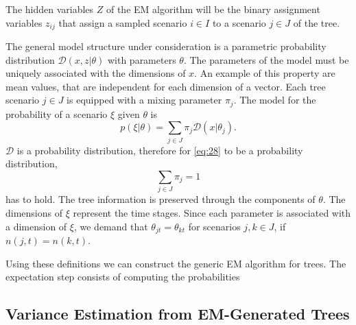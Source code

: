 The hidden variables $Z$ of the EM algorithm will be the binary assignment variables $z_{ij}$ that
assign a sampled scenario $i\in I$ to a scenario $j\in J$ of the tree.

The general model structure under consideration is a parametric probability distribution $\mathcal{D}(x,z|\theta)$ with parameters $\theta$.
The parameters of the model must be uniquely associated with the dimensions of $x$.
An example of this property are mean values, that are independent for each dimension of a vector.
Each tree scenario $j\in J$ is equipped with a mixing parameter $\pi_j$.
The model for the probability of a scenario $\xi$ given $\theta$ is
\begin{equation}
  \label{eq:28}
  p(\xi|\theta) = \sum_{j\in J}\pi_j\mathcal{D}(x|\theta_j).
\end{equation}
$\mathcal{D}$ is a probability distribution, therefore for \eqref{eq:28} to be a probability distribution,
\begin{equation}
  \label{eq:30}
  \sum_{j\in J}\pi_j = 1
\end{equation}
has to hold.
The tree information is preserved through the components of $\theta$.
The dimensions of $\xi$ represent the time stages.
Since each parameter is associated with a dimension of $\xi$, we demand that $\theta_{jt}=\theta_{kt}$ for scenarios $j,k\in J$, if $n(j,t)=n(k,t)$.

Using these definitions we can construct the generic EM algorithm for trees.
The expectation step consists of computing the probabilities 

\subsection{Variance Estimation from EM-Generated Trees}
\label{sec:variance-estimation}


